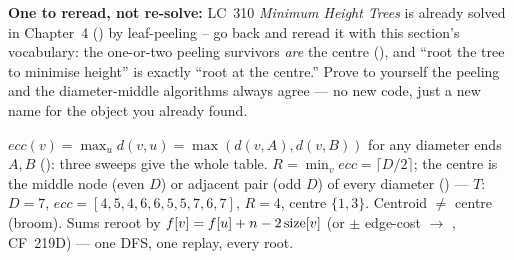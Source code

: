 \medskip
\noindent\textbf{One to reread, not re-solve:} LC~310 \emph{Minimum Height Trees} is
already solved in Chapter~4 () by leaf-peeling -- go back and reread it with
this section's vocabulary: the one-or-two peeling survivors \emph{are} the centre
(), and ``root the tree to minimise height'' is exactly ``root at
the centre.'' Prove to yourself the peeling and the diameter-middle algorithms always
agree --- no new code, just a new name for the object you already found.

\begin{recallbox}
$\mathit{ecc}(v) = \max_u d(v,u) = \max(d(v,A), d(v,B))$ for any diameter ends $A,B$
(): three sweeps give the whole table. $R = \min_v
\mathit{ecc} = \lceil D/2 \rceil$; the centre is the middle node (even $D$) or adjacent
pair (odd $D$) of every diameter () --- $T$: $D=7$,
$\mathit{ecc}=[4,5,4,6,6,5,5,7,6,7]$, $R=4$, centre $\{1,3\}$. Centroid $\ne$ centre
(broom). Sums reroot by $f[v] = f[u] + n - 2\operatorname{size}[v]$ (or $\pm$ edge-cost
$\to$ , CF~219D) --- one DFS, one replay, every root.
\end{recallbox}
